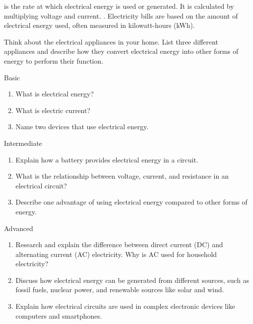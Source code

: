 \begin{marginnote}
 is the rate at which electrical energy is used or generated.  It is calculated by multiplying voltage and current. .  Electricity bills are based on the amount of electrical energy used, often measured in kilowatt-hours (kWh).
\end{marginnote}

\begin{stopandthink}
Think about the electrical appliances in your home.  List three different appliances and describe how they convert electrical energy into other forms of energy to perform their function.
\end{stopandthink}


\begin{tieredquestions}{Basic}
\begin{enumerate}
    \item What is electrical energy?
    \item What is electric current?
    \item Name two devices that use electrical energy.
\end{enumerate}
\end{tieredquestions}

\begin{tieredquestions}{Intermediate}
\begin{enumerate}
    \item Explain how a battery provides electrical energy in a circuit.
    \item What is the relationship between voltage, current, and resistance in an electrical circuit?
    \item Describe one advantage of using electrical energy compared to other forms of energy.
\end{enumerate}
\end{tieredquestions}

\begin{tieredquestions}{Advanced}
\begin{enumerate}
    \item Research and explain the difference between direct current (DC) and alternating current (AC) electricity.  Why is AC used for household electricity?
    \item Discuss how electrical energy can be generated from different sources, such as fossil fuels, nuclear power, and renewable sources like solar and wind.
    \item Explain how electrical circuits are used in complex electronic devices like computers and smartphones.
\end{enumerate}
\end{tieredquestions}


